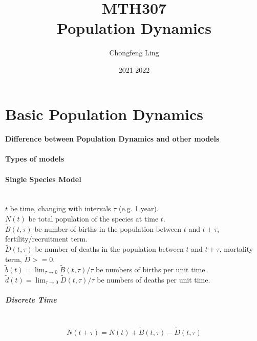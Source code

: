 \documentclass[12pt, a4paper, oneside]{article}
\title{{\Huge{\textbf{MTH307}}}\\\Huge{\textbf{Population Dynamics}}}
\author{Chongfeng Ling}
\date{2021-2022}
\begin{document}
\null  %
\nointerlineskip  %
\vfill
\let\snewpage \newpage
\let\newpage \relax
\maketitle
\setcounter{page}{0}
\thispagestyle{empty}
\let \newpage \snewpage
\vfill
\break %

\newpage
{}
\setcounter{page}{1}
\tableofcontents


\renewcommand\thepart{\Alph{part}}

\newpage
\setcounter{page}{1}


\section{Basic Population Dynamics}

\paragraph{Difference between Population Dynamics and other models}

\paragraph{Types of models}

\paragraph{Single Species Model}~{\\
$t$ be time, changing with intervals $\tau$ (e.g. 1 year).\\
$N(t)$ be total population of the species at time $t$.\\
$\tilde{B}(t, \tau)$ be number of births in the population between $t$ and $t+\tau$, fertility/recruitment term.\\
$\tilde{D}(t, \tau)$ be number of deaths in the population between $t$ and $t+\tau$, mortality term, $\tilde{D} >= 0$.\\
$\tilde{b}(t)=\lim _{\tau \rightarrow 0} \tilde{B}(t, \tau) / \tau$ be numbers of births per unit time.\\
$\tilde{d}(t)=\lim _{\tau \rightarrow 0} \tilde{D}(t, \tau) / \tau$ be numbers of deaths per unit time.
}

\subparagraph{Discrete Time}~{
\begin{equation}
    N(t+\tau)=N(t)+\tilde{B}(t, \tau)-\tilde{D}(t, \tau)\label{eq1.1}
\end{equation}
}
\end{document}
